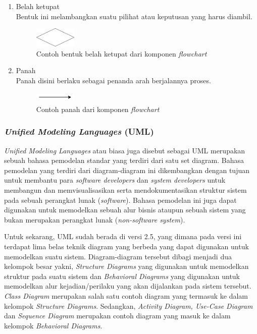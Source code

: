 \documentclass[a4paper]{article}
\newcommand{\subsubbab}[1]{%
    \subsubsection{#1}%
}
\begin{document}
\begin{enumerate}
    \newpage
    \item Belah ketupat\\
        Bentuk ini melambangkan suatu pilihat atau keputusan yang harus diambil.\\
    \begin{figure}[h]
        \centering
        \includegraphics*[width=2cm]{./diagram/flowchart/component/diamond.png}
        \caption{Contoh bentuk belah ketupat dari komponen \textit{flowchart}}
    \end{figure}
    \item Panah\\
        Panah disini berlaku sebagai penanda arah berjalannya proses.
    \begin{figure}[h]
        \centering
        \includegraphics*[width=2cm,height=0.5cm]{./diagram/flowchart/component/arrow.png}
        \caption{Contoh panah dari komponen \textit{flowchart}}
    \end{figure}
\end{enumerate}

\subsubbab{\textit{Unified Modeling Languages} (\textbf{UML})}
\textit{Unified Modeling Languages} atau biasa juga disebut sebagai UML merupakan sebuah bahasa pemodelan standar yang terdiri dari satu set diagram. Bahasa pemodelan yang terdiri dari diagram-diagram ini dikembangkan dengan tujuan untuk membantu para \textit{software developers} dan \textit{system developers} untuk membangun dan memvisualisasikan serta mendokumentasikan struktur sistem pada sebuah perangkat lunak (\textit{software}). Bahasa pemodelan ini juga dapat digunakan untuk memodelkan sebuah alur bisnis ataupun sebuah sistem yang bukan merupakan perangkat lunak (\textit{non-software system})\autocite{what-is-UML}.

Untuk sekarang, UML sudah berada di versi 2.5, yang dimana pada versi ini terdapat lima belas teknik diagram yang berbeda yang dapat digunakan untuk memodelkan suatu sistem. Diagram-diagram tersebut dibagi menjadi dua kelompok besar yakni, \textit{Structure Diagrams} yang digunakan untuk memodelkan struktur pada suatu sistem dan \textit{Behavioral Diagrams} yang digunakan untuk memodelkan alur kejadian/perilaku yang akan dijalankan pada sistem tersebut. \textit{Class Diagram} merupakan salah satu contoh diagram yang termasuk ke dalam kelompok \textit{Structure Diagrams}. Sedangkan, \textit{Activity Diagram, Use-Case Diagram} dan \textit{Sequence Diagram} merupakan contoh diagram yang masuk ke dalam kelompok \textit{Behavioral Diagrams}\autocite{systemanalysisdesign-with-uml-5}.
\end{document}
